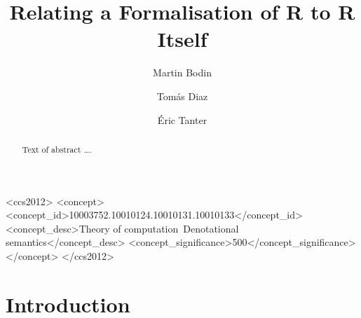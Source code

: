 \documentclass[
    sigplan,
    10pt,
    review, %
    natbib=false %
 ]{acmart}
\begin{document}
\title{Relating a Formalisation of R to R Itself} %

\author{Martin Bodin}

\author{Tomás Diaz}

\author{Éric Tanter}

\begin{abstract}
Text of abstract \ldots.
\end{abstract}

\begin{CCSXML}
    <ccs2012>
    <concept>
    <concept_id>10003752.10010124.10010131.10010133</concept_id>
    <concept_desc>Theory of computation~Denotational semantics</concept_desc>
    <concept_significance>500</concept_significance>
    </concept>
    </ccs2012>
\end{CCSXML}



\maketitle

\section{Introduction}
\label{sec:intro}
\end{document}
